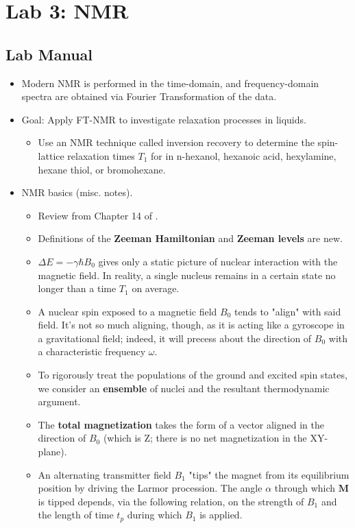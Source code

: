 \documentclass[../notes.tex]{subfiles}
\begin{document}
\section{Lab 3: NMR}
\subsection*{Lab Manual}
\begin{itemize}
    \item Modern NMR is performed in the time-domain, and frequency-domain spectra are obtained via Fourier Transformation of the data.
    \item Goal: Apply FT-NMR to investigate relaxation processes in liquids.
    \begin{itemize}
        \item Use an NMR technique called inversion recovery to determine the spin-lattice relaxation times $T_1$ for  in n-hexanol, hexanoic acid, hexylamine, hexane thiol, or bromohexane.
    \end{itemize}
    \item NMR basics (misc. notes).
    \begin{itemize}
        \item Review from Chapter 14 of \textcite{bib:McQuarrieSimon}.
        \item Definitions of the \textbf{Zeeman Hamiltonian} and \textbf{Zeeman levels} are new.
        \item $\Delta E=-\gamma\hbar B_0$ gives only a static picture of nuclear interaction with the magnetic field. In reality, a single nucleus remains in a certain state no longer than a time $T_1$ on average.
        \item A nuclear spin exposed to a magnetic field $B_0$ tends to "align" with said field. It's not so much aligning, though, as it is acting like a gyroscope in a gravitational field; indeed, it will precess about the direction of $B_0$ with a characteristic frequency $\omega$.
        \item To rigorously treat the populations of the ground and excited spin states, we consider an \textbf{ensemble} of nuclei and the resultant thermodynamic argument.
        \item The \textbf{total magnetization} takes the form of a vector aligned in the direction of $B_0$ (which is Z; there is no net magnetization in the XY-plane).
        \item An alternating transmitter field $B_1$ "tips" the magnet from its equilibrium position by driving the Larmor procession. The angle $\alpha$ through which $\mathbf{M}$ is tipped depends, via the following relation, on the strength of $B_1$ and the length of time $t_p$ during which $B_1$ is applied.

\end{itemize}
\end{itemize}
\end{document}
